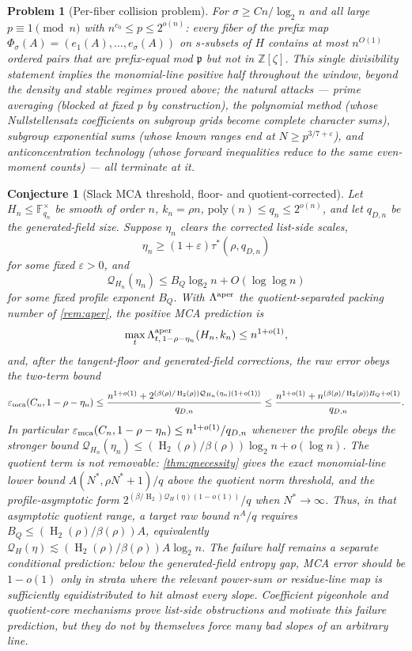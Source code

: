 \documentclass[11pt]{article}
\newtheorem{conjecture}[conjecture]{Conjecture}
\newtheorem{problem}[problem]{Problem}
\theoremstyle{definition}
\newcommand{\F}{\mathbb F}
\newcommand{\Z}{\mathbb Z}
\newcommand{\eps}{\varepsilon}
\newcommand{\HH}{\operatorname{H}_2}
\newcommand{\emca}{\eps_{\rm mca}}
\newcommand{\taustar}{\tau^{*}}
\newcommand{\Acl}{A}
\begin{document}
\begin{problem}[Per-fiber collision problem]\label{prob:perfiber}
For $\sigma\ge Cn/\log_2n$ and all large $p\equiv1\pmod n$ with $n^{c_0}\le p\le2^{o(n)}$: every fiber of the prefix map $\Phi_\sigma(A)=(e_1(A),\dots,e_\sigma(A))$ on $s$-subsets of $H$ contains at most $n^{O(1)}$ ordered pairs that are prefix-equal mod $\mathfrak p$ but not in $\Z[\zeta]$.  This single divisibility statement implies the monomial-line positive half throughout the window, beyond the density and stable regimes proved above; the natural attacks --- prime averaging (blocked at fixed $p$ by construction), the polynomial method (whose Nullstellensatz coefficients on subgroup grids become complete character sums), subgroup exponential sums (whose known ranges end at $N\ge p^{3/7+\eps}$), and anticoncentration technology (whose forward inequalities reduce to the same even-moment counts) --- all terminate at it.
\end{problem}

\begin{conjecture}[Slack MCA threshold, floor- and quotient-corrected]\label{conj:B}
Let $H_n\le\F_{q_n}^\times$ be smooth of order $n$, $k_n=\rho n$, $\mathrm{poly}(n)\le q_n\le2^{o(n)}$, and let $q_{D,n}$ be the generated-field size.  Suppose $\eta_n$ clears the corrected list-side scales,
\[
        \eta_n\ge(1+\eps)\taustar(\rho,q_{D,n})
\]
for some fixed $\eps>0$, and
\[
        \mathcal Q_{H_n}(\eta_n)\le B_Q\log_2 n+O(\log\log n)
\]
for some fixed profile exponent $B_Q$.  With $\Lambda^{\rm aper}$ the quotient-separated packing number of \cref{rem:aper}, the positive MCA prediction is
\[
        \max_t\Lambda^{\rm aper}_{t,\,1-\rho-\eta_n}(H_n,k_n)\le n^{1+o(1)},
\]
and, after the tangent-floor and generated-field corrections, the raw error obeys the two-term bound
\[
        \emca(C_n,1-\rho-\eta_n)
        \le
        \frac{n^{1+o(1)}+2^{(\beta(\rho)/\HH(\rho))\mathcal Q_{H_n}(\eta_n)(1+o(1))}}{q_{D,n}}
        \le
        \frac{n^{1+o(1)}+n^{(\beta(\rho)/\HH(\rho))B_Q+o(1)}}{q_{D,n}}.
\]
In particular $\emca(C_n,1-\rho-\eta_n)\le n^{1+o(1)}/q_{D,n}$ whenever the profile obeys the stronger bound $\mathcal Q_{H_n}(\eta_n)\le(\HH(\rho)/\beta(\rho))\log_2n+o(\log n)$.  The quotient term is not removable: \cref{thm:qnecessity} gives the exact monomial-line lower bound $\Acl(N^*,\rho N^*+1)/q$ above the quotient norm threshold, and the profile-asymptotic form $2^{(\beta/\HH)\mathcal Q_H(\eta)(1-o(1))}/q$ when $N^*\to\infty$.  Thus, in that asymptotic quotient range, a target raw bound $n^A/q$ requires $B_Q\le(\HH(\rho)/\beta(\rho))A$, equivalently $\mathcal Q_H(\eta)\lesssim(\HH(\rho)/\beta(\rho))A\log_2n$.  The failure half remains a separate conditional prediction: below the generated-field entropy gap, MCA error should be $1-o(1)$ only in strata where the relevant power-sum or residue-line map is sufficiently equidistributed to hit almost every slope.  Coefficient pigeonhole and quotient-core mechanisms prove list-side obstructions and motivate this failure prediction, but they do not by themselves force many bad slopes of an arbitrary line.
\end{conjecture}
\end{document}
